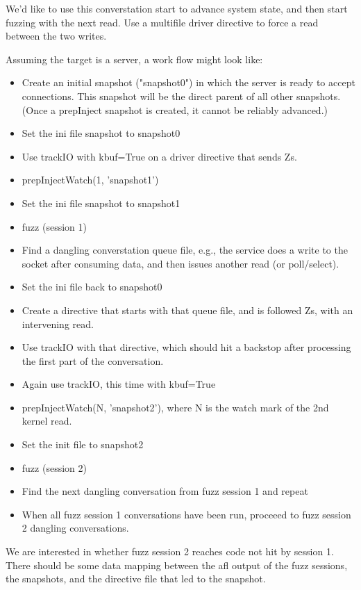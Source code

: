 \documentclass[titlepage]{article}
\begin{document}
\begin{appendices}
We'd like to use this converstation start to advance system state, and then start fuzzing with the next read.  Use a 
multifile driver directive to force a read between the two writes.

Assuming the target is a server, a work flow might look like:
\begin{itemize}
\item Create an initial snapshot ("snapshot0") in which the server is ready to accept connections.  This snapshot
will be the direct parent of all other snapshots. (Once a prepInject snapshot is created, it cannot be reliably
advanced.)
\item Set the ini file snapshot to snapshot0
\item Use trackIO with kbuf=True on a driver directive that sends Zs.
\item prepInjectWatch(1, 'snapshot1')
\item Set the ini file snapshot to snapshot1
\item fuzz (session 1)
\item Find a dangling converstation queue file, e.g., the service does a write to the socket after consuming data, and then issues another read (or poll/select).
\item Set the ini file back to snapshot0
\item Create a directive that starts with that queue file, and is followed Zs, with an intervening read.
\item Use trackIO with that directive, which should hit a backstop after processing the first part of the conversation.
\item Again use trackIO, this time with kbuf=True
\item prepInjectWatch(N, 'snapshot2'), where N is the watch mark of the 2nd kernel read.
\item Set the init file to snapshot2
\item fuzz (session 2)
\item Find the next dangling conversation from fuzz session 1 and repeat
\item When all fuzz session 1 conversations have been run, proceeed to fuzz session 2 dangling conversations.
\end{itemize}

We are interested in whether fuzz session 2 reaches code not hit by session 1.
There should be some data mapping between the afl output of the fuzz sessions, the snapshots,
and the directive file that led to the snapshot.


\end{appendices}
\end{document}
